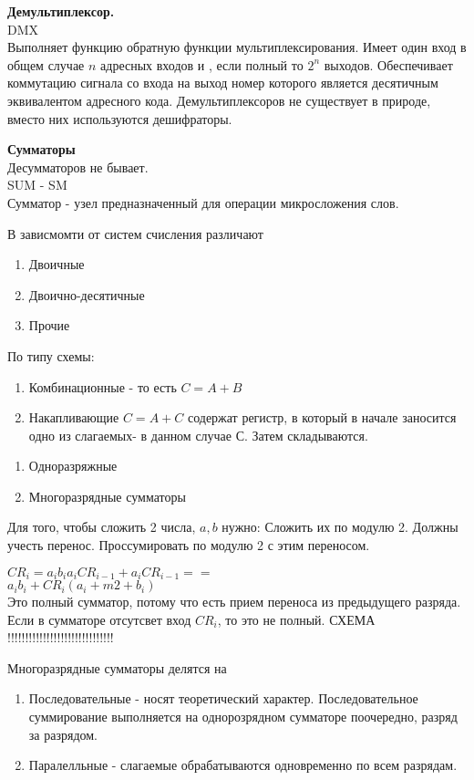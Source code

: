 \Large{ \textbf {Демультиплексор.}}\\
DMX\\
Выполняет функцию обратную функции мультиплексирования.
Имеет один вход в общем случае $n$ адресных входов и , если полный то $2^n$ выходов.
Обеспечивает коммутацию сигнала со входа на выход номер которого является десятичным эквивалентом адресного кода.
Демультиплексоров не существует в природе, вместо них используются дешифраторы.

\Large{ \textbf {Сумматоры}}\\
Десумматоров не бывает.\\
SUM - SM\\
Сумматор - узел предназначенный для операции микросложения слов.

В зависмомти от систем счисления различают
\begin{enumerate}
  \item Двоичные
  \item Двоично-десятичные
  \item Прочие
\end{enumerate}

По типу схемы:

\begin{enumerate}
  \item Комбинационные - то есть $ C = A + B $
  \item Накапливающие $ C = A + C $ содержат регистр, в который в начале заносится одно из слагаемых- в данном случае С. Затем складываются.
\end{enumerate}


\begin{enumerate}
  \item Одноразряжные
  \item Многоразрядные сумматоры
\end{enumerate}



Для того, чтобы сложить 2 числа, $a,b$ нужно:
Сложить их по модулю 2. Должны учесть перенос. Проссумировать по модулю 2 с этим переносом.

$CR_i = a_i b_i  a_i CR_{i-1} +a_i CR_{i-1} ==$\\
$a_i b_i + CR_i (a_i +m2+ b_i)$\\
Это полный сумматор, потому что есть прием переноса из предыдущего разряда.\\
Если в сумматоре отсутсвет вход $ CR_i $, то это не полный.
СХЕМА !!!!!!!!!!!!!!!!!!!!!!!!!!!!!!

Многоразрядные сумматоры делятся на
\begin{enumerate}
  \item Последовательные - носят теоретический характер.
  Последовательное суммирование выполняется на однорозрядном сумматоре поочередно, разряд за разрядом.
  \item Паралелльные - слагаемые обрабатываются одновременно по всем разрядам.
\end{enumerate}

